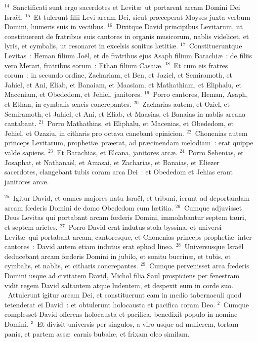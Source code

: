 ${}^{14}$~Sanctificati sunt ergo sacerdotes et Levit\ae\ ut portarent arcam Domini Dei Isra\"el.
${}^{15}$~Et tulerunt filii Levi arcam Dei, sicut pr\ae ceperat Moyses juxta verbum Domini, humeris suis in vectibus.
${}^{16}$~Dixitque David principibus Levitarum, ut constituerent de fratribus suis cantores in organis musicorum, nablis videlicet, et lyris, et cymbalis, ut resonaret in excelsis sonitus l\ae titi\ae .
${}^{17}$~Constitueruntque Levitas~: Heman filium Jo\"el, et de fratribus ejus Asaph filium Barachi\ae~: de filiis vero Merari, fratribus eorum~: Ethan filium Casai\ae .
${}^{18}$~Et cum eis fratres eorum~: in secundo ordine, Zachariam, et Ben, et Jaziel, et Semiramoth, et Jahiel, et Ani, Eliab, et Banaiam, et Maasiam, et Mathathiam, et Eliphalu, et Maceniam, et Obededom, et Jehiel, janitores.
${}^{19}$~Porro cantores, Heman, Asaph, et Ethan, in cymbalis \ae neis concrepantes.
${}^{20}$~Zacharias autem, et Oziel, et Semiramoth, et Jahiel, et Ani, et Eliab, et Maasias, et Banaias in nablis arcana cantabant.
${}^{21}$~Porro Mathathias, et Eliphalu, et Macenias, et Obededom, et Jehiel, et Ozaziu, in citharis pro octava canebant epinicion.
${}^{22}$~Chonenias autem princeps Levitarum, propheti\ae\ pr\ae erat, ad pr\ae cinendam melodiam~: erat quippe valde sapiens.
${}^{23}$~Et Barachias, et Elcana, janitores arc\ae .
${}^{24}$~Porro Sebenias, et Josaphat, et Nathana\"el, et Amasai, et Zacharias, et Banaias, et Eliezer sacerdotes, clangebant tubis coram arca Dei~: et Obededom et Jehias erant janitores arc\ae .


${}^{25}$~Igitur David, et omnes majores natu Isra\"el, et tribuni, ierunt ad deportandam arcam fœderis Domini de domo Obededom cum l\ae titia.
${}^{26}$~Cumque adjuvisset Deus Levitas qui portabant arcam fœderis Domini, immolabantur septem tauri, et septem arietes.
${}^{27}$~Porro David erat indutus stola byssina, et universi Levit\ae\ qui portabant arcam, cantoresque, et Chonenias princeps propheti\ae\ inter cantores~: David autem etiam indutus erat ephod lineo.
${}^{28}$~Universusque Isra\"el deducebant arcam fœderis Domini in jubilo, et sonitu buccin\ae , et tubis, et cymbalis, et nablis, et citharis concrepantes.
${}^{29}$~Cumque pervenisset arca fœderis Domini usque ad civitatem David, Michol filia Saul prospiciens per fenestram vidit regem David saltantem atque ludentem, et despexit eum in corde suo.
~Attulerunt igitur arcam Dei, et constituerunt eam in medio tabernaculi quod tetenderat ei David~: et obtulerunt holocausta et pacifica coram Deo.
${}^{2}$~Cumque complesset David offerens holocausta et pacifica, benedixit populo in nomine Domini.
${}^{3}$~Et divisit universis per singulos, a viro usque ad mulierem, tortam panis, et partem ass\ae\ carnis bubal\ae , et frixam oleo similam.


